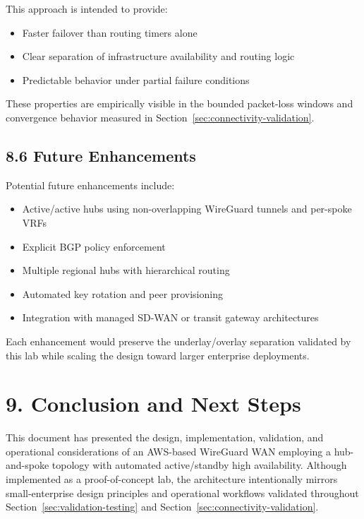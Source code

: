 \documentclass[11pt]{article}
\begin{document}
This approach is intended to provide:
\begin{itemize}
\item Faster failover than routing timers alone
\item Clear separation of infrastructure availability and routing logic
\item Predictable behavior under partial failure conditions
\end{itemize}

These properties are empirically visible in the bounded packet-loss windows and convergence behavior measured in Section~\ref{sec:connectivity-validation}.

\subsection{8.6 Future Enhancements}
\label{subsec:future-enhancements}

Potential future enhancements include:
\begin{itemize}
\item Active/active hubs using non-overlapping WireGuard tunnels and per-spoke VRFs
\item Explicit BGP policy enforcement
\item Multiple regional hubs with hierarchical routing
\item Automated key rotation and peer provisioning
\item Integration with managed SD-WAN or transit gateway architectures
\end{itemize}

Each enhancement would preserve the underlay/overlay separation validated by this lab while scaling the design toward larger enterprise deployments.

%
%
\section{9. Conclusion and Next Steps}
\label{sec:conclusion-next-steps}

This document has presented the design, implementation, validation, and operational considerations of an AWS-based WireGuard WAN employing a hub-and-spoke topology with automated active/standby high availability. Although implemented as a proof-of-concept lab, the architecture intentionally mirrors small-enterprise design principles and operational workflows validated throughout Section~\ref{sec:validation-testing} and Section~\ref{sec:connectivity-validation}.
\end{document}
